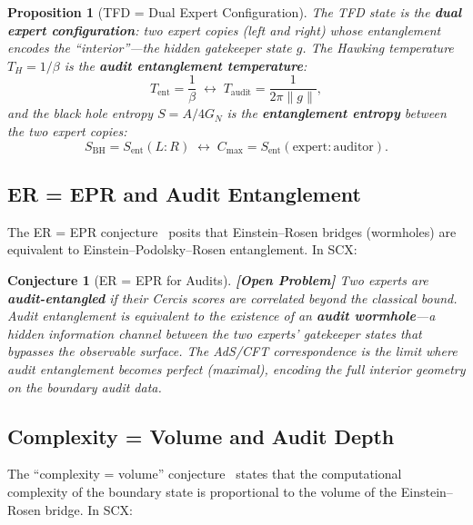 \documentclass[12pt,a4paper]{article}
\newtheorem{proposition}[theorem]{Proposition}
\newtheorem{conjecture}[theorem]{Conjecture}
\theoremstyle{remark}
\newcommand{\SCX}{\textsf{SCX}}
\newcommand{\Cercis}{\textsf{Cercis}}
\newcommand{\openproblem}{\textbf{[Open Problem]}}
\begin{document}
\begin{proposition}[TFD = Dual Expert Configuration]
\label{prop:tfd_dual}
The TFD state is the \textbf{dual expert configuration}: two expert copies (left and right) whose entanglement encodes the ``interior''---the hidden gatekeeper state $g$. The Hawking temperature $T_H = 1/\beta$ is the \textbf{audit entanglement temperature}:
\begin{equation}
  T_{\text{ent}} = \frac{1}{\beta} \;\longleftrightarrow\; T_{\text{audit}} = \frac{1}{2\pi\|g\|},
\end{equation}
and the black hole entropy $S = A/4G_N$ is the \textbf{entanglement entropy} between the two expert copies:
\begin{equation}
  S_{\text{BH}} = S_{\text{ent}}(L:R) \;\longleftrightarrow\; C_{\max} = S_{\text{ent}}(\text{expert} : \text{auditor}).
\end{equation}
\end{proposition}

\subsection{ER = EPR and Audit Entanglement}

The ER = EPR conjecture~\cite{maldacena2013cool} posits that Einstein--Rosen bridges (wormholes) are equivalent to Einstein--Podolsky--Rosen entanglement. In \SCX{}:

\begin{conjecture}[ER = EPR for Audits]
\label{conj:er_epr_audit}
\openproblem
Two experts are \textbf{audit-entangled} if their \Cercis{} scores are correlated beyond the classical bound. Audit entanglement is equivalent to the existence of an \textbf{audit wormhole}---a hidden information channel between the two experts' gatekeeper states that bypasses the observable surface. The AdS/CFT correspondence is the limit where audit entanglement becomes perfect (maximal), encoding the full interior geometry on the boundary audit data.
\end{conjecture}

\subsection{Complexity = Volume and Audit Depth}

The ``complexity = volume'' conjecture~\cite{susskind2014computational} states that the computational complexity of the boundary state is proportional to the volume of the Einstein--Rosen bridge. In \SCX{}:
\end{document}
